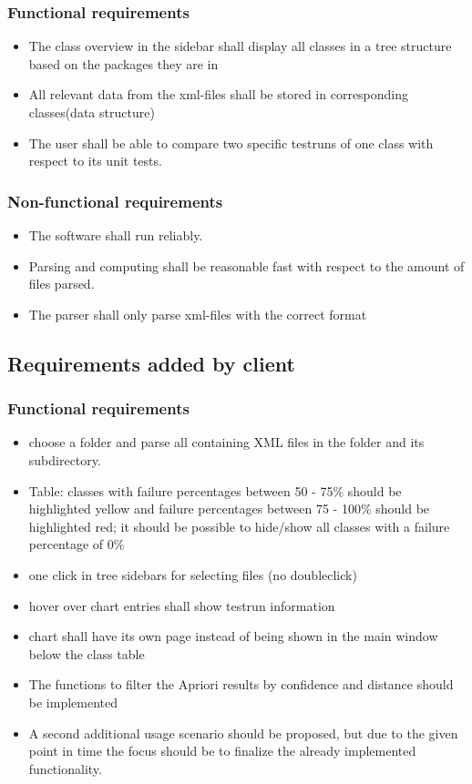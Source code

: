 \subsubsection{Functional requirements}
\begin{itemize}
	\item The class overview in the sidebar shall display all classes in a tree structure based on the packages they are in
	\item All relevant data from the xml-files shall be stored in corresponding classes(data structure)
	\item The user shall be able to compare two specific testruns of one class with respect to its unit tests.
\end{itemize}

\subsubsection{Non-functional requirements}
\begin{itemize}
	\item The software shall run reliably.
	\item Parsing and computing shall be reasonable fast with respect to the amount of files parsed.
	\item The parser shall only parse xml-files with the correct format
\end{itemize}
\subsection{Requirements added by client}
\subsubsection{Functional requirements}

\begin{itemize}

\item choose a folder and parse all containing XML files in the folder and its subdirectory.

\item Table: classes with failure percentages between 50 - 75\% should be highlighted yellow and failure percentages between 75 - 100\% should be highlighted red; it should be possible to hide/show all classes with a failure percentage of 0\%

\item one click in tree sidebars for selecting files (no doubleclick)
\item hover over chart entries shall show testrun information
\item chart shall have its own page instead of being shown in the main window below the class table
\item The functions to filter the Apriori results by confidence and distance should be implemented

\item A second additional usage scenario should be proposed, but due to the given point in time the focus should be to finalize the already implemented functionality.

\end{itemize}

